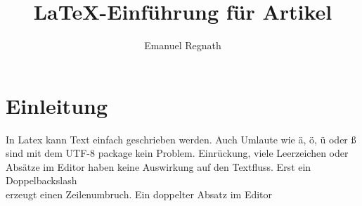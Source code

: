 \renewcommand{\arraystretch}{1.4}				%


\title{LaTeX-Einführung für Artikel}
\author{Emanuel Regnath}











\maketitle

\vspace{4.0cm}		%

\tableofcontents


\newpage



\section{Einleitung}	%

In Latex kann Text einfach geschrieben werden. Auch Umlaute wie ä, ö, ü oder ß sind mit dem UTF-8 package kein Problem.
	Einrückung, viele           Leerzeichen oder Absätze im Editor
haben keine Auswirkung auf den Textfluss.
Erst ein Doppelbackslash\\											%
erzeugt einen Zeilenumbruch. Ein doppelter Absatz im Editor			%

